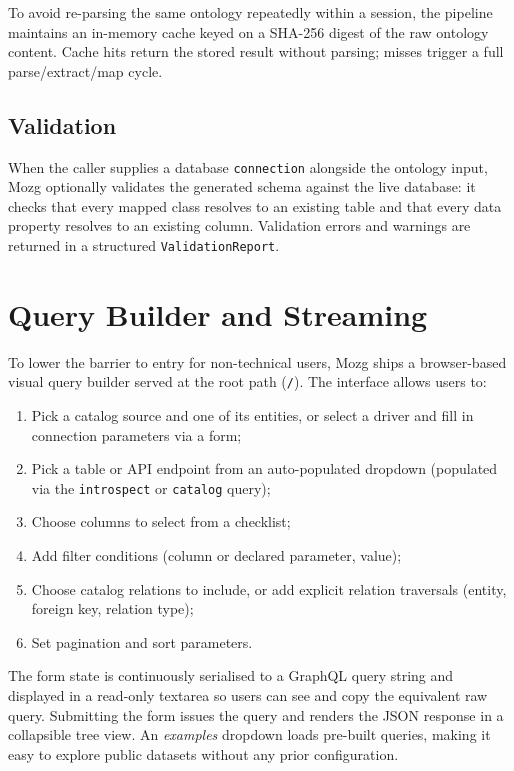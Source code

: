 \documentclass[sigconf,nonacm]{acmart}
\begin{document}
To avoid re-parsing the same ontology repeatedly within a session,
the pipeline maintains an in-memory cache keyed on a SHA-256 digest
of the raw ontology content.  Cache hits return the stored result
without parsing; misses trigger a full parse/extract/map cycle.

\subsection{Validation}

When the caller supplies a database \texttt{connection} alongside the
ontology input, Mozg optionally validates the generated schema against
the live database: it checks that every mapped class resolves to an
existing table and that every data property resolves to an existing
column.  Validation errors and warnings are returned in a structured
\texttt{ValidationReport}.

\section{Query Builder and Streaming}
\label{sec:ui}

To lower the barrier to entry for non-technical users, Mozg ships a
browser-based visual query builder served at the root path
(\texttt{/}).  The interface allows users to:
\begin{enumerate}
  \item Pick a catalog source and one of its entities, or select a
        driver and fill in connection parameters via a form;
  \item Pick a table or API endpoint from an auto-populated dropdown
        (populated via the \texttt{introspect} or \texttt{catalog}
        query);
  \item Choose columns to select from a checklist;
  \item Add filter conditions (column or declared parameter, value);
  \item Choose catalog relations to include, or add explicit relation
        traversals (entity, foreign key, relation type);
  \item Set pagination and sort parameters.
\end{enumerate}
The form state is continuously serialised to a GraphQL query string
and displayed in a read-only textarea so users can see and copy the
equivalent raw query.  Submitting the form issues the query and
renders the JSON response in a collapsible tree view.  An
\emph{examples} dropdown loads pre-built queries, making it easy to
explore public datasets without any prior configuration.
\end{document}
